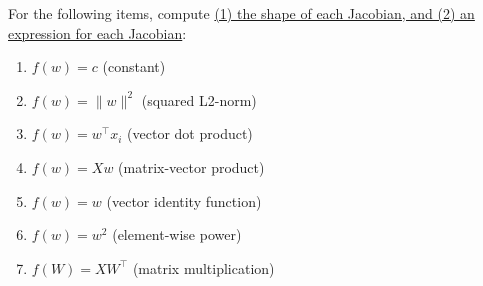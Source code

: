 For the following items, compute 
{\underline{(1) the shape of each Jacobian, and (2) an expression for each Jacobian}}:
\begin{enumerate}
    \item $f(w) = c$ (constant) \\ 
        \solution{    
        \[
            \frac{d}{dw}\left( f(w)\right) = 0
        \]}
    \item $f(w) = \|w\|^2$ (squared L2-norm) \\ 
        \solution{   
            \[
            \frac{d}{dw}\left( f(w)\right) = 
            2w
            \]
        }
    \item $f(w) = w^\top x_i$ (vector dot product)\\
        \solution{  
            \[
            \frac{d}{dw}\left( f(w)\right) = 
            x_i
            \]
        }
    \item $f(w) = Xw$ (matrix-vector product) \\ 
        \solution{
            \[
            \frac{d}{dw} = X
            \]
        }
    \item $f(w) = w$ (vector identity function)\\ 
        \solution{\[
        \begin{bmatrix}
            1 \\ 1 \\ 1 \\ \vdots \\ 1
        \end{bmatrix}
        \]}
    \item $f(w) = w^2$ (element-wise power)\\
    \item \extracredit{} $f(W) =  X W^\top$ (matrix multiplication)\\
        \solution{\[
            \frac{dX}{dW} =  X
        \]}
\end{enumerate}

\clearpage


